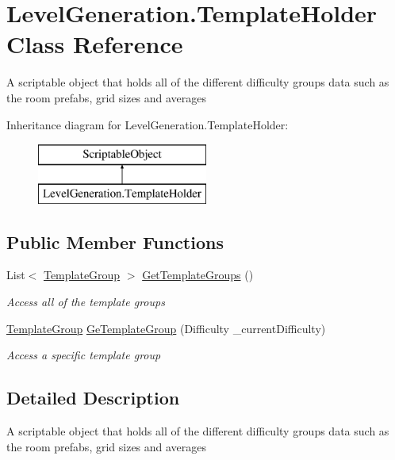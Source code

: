 \hypertarget{class_level_generation_1_1_template_holder}{}\section{Level\+Generation.\+Template\+Holder Class Reference}
\label{class_level_generation_1_1_template_holder}


A scriptable object that holds all of the different difficulty groups data such as the room prefabs, grid sizes and averages  


Inheritance diagram for Level\+Generation.\+Template\+Holder\+:\begin{figure}[H]
\begin{center}
\leavevmode
\includegraphics[height=2.000000cm]{class_level_generation_1_1_template_holder}
\end{center}
\end{figure}
\subsection*{Public Member Functions}
\begin{DoxyCompactItemize}
\item 
List$<$ \mbox{\hyperlink{class_level_generation_1_1_template_group}{Template\+Group}} $>$ \mbox{\hyperlink{class_level_generation_1_1_template_holder_a7bf3b585f3b2a6de8b5c0b32f34786ce}{Get\+Template\+Groups}} ()
\begin{DoxyCompactList}\small\item\em Access all of the template groups \end{DoxyCompactList}\item 
\mbox{\hyperlink{class_level_generation_1_1_template_group}{Template\+Group}} \mbox{\hyperlink{class_level_generation_1_1_template_holder_ad2e43ac2d95bff2cc2ac9afdc9cccc8e}{Ge\+Template\+Group}} (Difficulty \+\_\+current\+Difficulty)
\begin{DoxyCompactList}\small\item\em Access a specific template group \end{DoxyCompactList}\end{DoxyCompactItemize}


\subsection{Detailed Description}
A scriptable object that holds all of the different difficulty groups data such as the room prefabs, grid sizes and averages 



